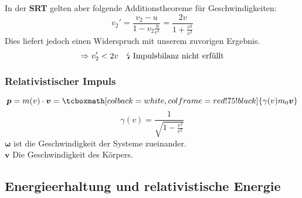\documentclass[titlepage,11pt,a4paper,ngerman]{report}
\newcommand{\tx}[1]{\textrm{#1}}
\renewcommand{\vec}[1]{\boldsymbol{#1}}
\newcommand{\rmbox}[1]{\tcboxmath[colback=white,colframe=red!75!black]{#1}}
\begin{document}
In der \textbf{SRT} gelten aber folgende Additionstheoreme für Geschwindigkeiten:
\begin{equation*}
v_2' = \frac{v_2 - u}{1 - v_2 \frac{u}{c^2}} = \frac{2 v}{1 + \frac{v^2}{c^2}}
\end{equation*}
Dies liefert jedoch einen Widerspruch mit unserem zuvorigen Ergebnis.
\begin{equation*}
\Rightarrow v_2' < 2v \quad \tx{\lightning\ Impulsbilanz nicht erfüllt}
\end{equation*}

\subsubsection{Relativistischer Impuls}
\begin{equation*}
\vec{p} = m(v) \cdot \vec{v} = \rmbox{\gamma(v) m_0 \vec{v}}
\end{equation*}
\begin{equation*}
\gamma(v) = \frac{1}{\sqrt{1 - \frac{v^2}{c^2}}}
\end{equation*}
$ \vec{\omega} $ ist die Geschwindigkeit der Systeme zueinander.\\
$ \vec{v} $ Die Geschwindigkeit des Körpers.

\subsection{Energieerhaltung und relativistische Energie}
\end{document}
